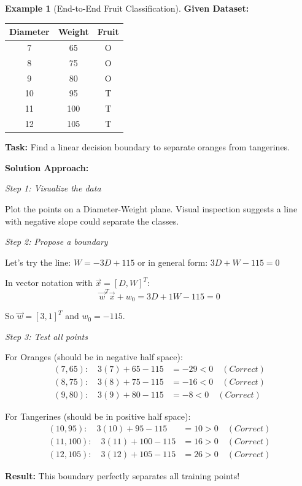 \documentclass[12pt,a4paper]{article}
\theoremstyle{directpoint}
\theoremstyle{definition}
\newtheorem{example}{Example}[section]
\begin{document}
\begin{example}[End-to-End Fruit Classification]
\textbf{Given Dataset:}

\begin{center}
\begin{tabular}{|c|c|c|}
\hline
\textbf{Diameter} & \textbf{Weight} & \textbf{Fruit} \\
\hline
7 & 65 & O \\
8 & 75 & O \\
9 & 80 & O \\
10 & 95 & T \\
11 & 100 & T \\
12 & 105 & T \\
\hline
\end{tabular}
\end{center}

\textbf{Task:} Find a linear decision boundary to separate oranges from tangerines.

\textbf{Solution Approach:}

\textit{Step 1: Visualize the data}

Plot the points on a Diameter-Weight plane. Visual inspection suggests a line with negative slope could separate the classes.

\textit{Step 2: Propose a boundary}

Let's try the line: $W = -3D + 115$ or in general form: $3D + W - 115 = 0$

In vector notation with $\vec{x} = [D, W]^T$:
\begin{equation}
\vec{w}^T\vec{x} + w_0 = 3D + 1W - 115 = 0
\end{equation}

So $\vec{w} = [3, 1]^T$ and $w_0 = -115$.

\textit{Step 3: Test all points}

For Oranges (should be in negative half space):
\begin{align}
(7, 65): \quad 3(7) + 65 - 115 &= -29 < 0 \quad (Correct) \\
(8, 75): \quad 3(8) + 75 - 115 &= -16 < 0 \quad (Correct) \\
(9, 80): \quad 3(9) + 80 - 115 &= -8 < 0 \quad (Correct)
\end{align}

For Tangerines (should be in positive half space):
\begin{align}
(10, 95): \quad 3(10) + 95 - 115 &= 10 > 0 \quad (Correct) \\
(11, 100): \quad 3(11) + 100 - 115 &= 16 > 0 \quad (Correct) \\
(12, 105): \quad 3(12) + 105 - 115 &= 26 > 0 \quad (Correct)
\end{align}

\textbf{Result:} This boundary perfectly separates all training points!
\end{example}
\end{document}
